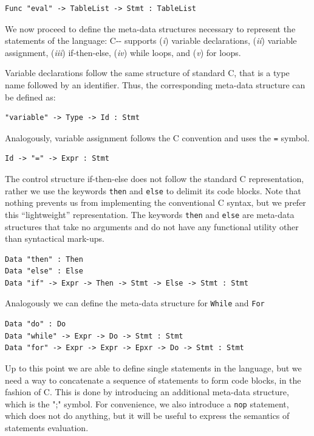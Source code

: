 \begin{lstlisting}
Func "eval" -> TableList -> Stmt : TableList
\end{lstlisting}

We now proceed to define the meta-data structures necessary to represent the statements of the language: C-{}- supports (\textit{i}) variable declarations, (\textit{ii}) variable assignment, (\textit{iii}) if-then-else, (\textit{iv}) while loops, and (\textit{v}) for loops.

Variable declarations follow the same structure of standard C, that is a type name followed by an identifier. Thus, the corresponding meta-data structure can be defined as:

\begin{lstlisting}
"variable" -> Type -> Id : Stmt
\end{lstlisting}

\noindent
Analogously, variable assignment follows the C convention and uses the \texttt{=} symbol.

\begin{lstlisting}
Id -> "=" -> Expr : Stmt
\end{lstlisting}

The control structure if-then-else does not follow the standard C representation, rather we use the keywords \texttt{then} and \texttt{else} to delimit its code blocks. Note that nothing prevents us from implementing the conventional C syntax, but we prefer this ``lightweight'' representation. The keywords \texttt{then} and \texttt{else} are meta-data structures that take no arguments and do not have any functional utility other than syntactical mark-ups.

\begin{lstlisting}
Data "then" : Then
Data "else" : Else
Data "if" -> Expr -> Then -> Stmt -> Else -> Stmt : Stmt
\end{lstlisting}

Analogously we can define the meta-data structure for \texttt{While} and \texttt{For}

\begin{lstlisting}
Data "do" : Do
Data "while" -> Expr -> Do -> Stmt : Stmt
Data "for" -> Expr -> Expr -> Epxr -> Do -> Stmt : Stmt
\end{lstlisting}

\noindent
Up to this point we are able to define single statements in the language, but we need a way to concatenate a sequence of statements to form code blocks, in the fashion of C. This is done by introducing an additional meta-data structure, which is the ";" symbol. For convenience, we also introduce a \texttt{nop} statement, which does not do anything, but it will be useful to express the semantics of statements evaluation.

